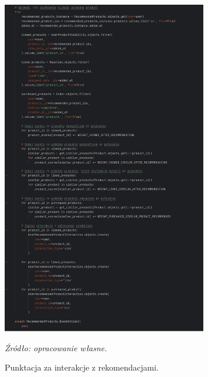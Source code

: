 \documentclass[12pt,a4paper,oneside]{article}
\theoremstyle{definition}
\numberwithin{equation}{section}
\begin{document}
\begin{figure}[H]
    \centering
    \includegraphics[width=0.8\textwidth]{images/krzysztofBImages/recommended_algorithm_update.png}
    \caption{Punktacja za interakcje z rekomendacjami.}
    \emph{Źródło: opracowanie własne.}
    \label{fig:recommendation_step3}
\end{figure}
%
%
\end{document}
